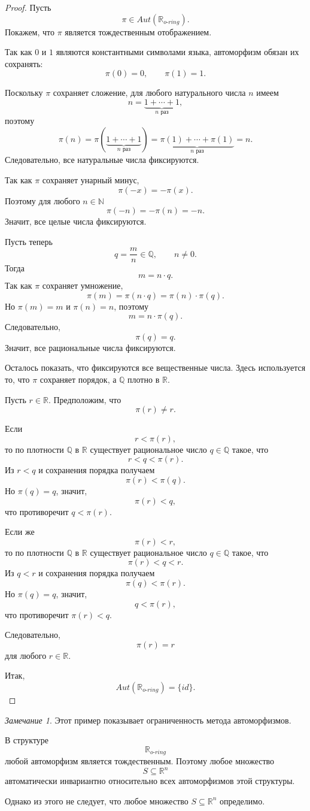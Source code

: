 \documentclass[12pt,a4paper,oneside,openany]{book}
\theoremstyle{definition}
\theoremstyle{plain}
\theoremstyle{remark}
\newtheorem{remark}{Замечание}[chapter]
\begin{document}
\begin{proof}
Пусть
\[
\pi\in Aut(\mathbb R_{o\text{-}ring}).
\]
Покажем, что $\pi$ является тождественным отображением.

Так как $0$ и $1$ являются константными символами языка, автоморфизм обязан их сохранять:
\[
\pi(0)=0,
\qquad
\pi(1)=1.
\]

Поскольку $\pi$ сохраняет сложение, для любого натурального числа $n$ имеем
\[
n=\underbrace{1+\cdots+1}_{n\text{ раз}},
\]
поэтому
\[
\pi(n)
=
\pi(\underbrace{1+\cdots+1}_{n\text{ раз}})
=
\underbrace{\pi(1)+\cdots+\pi(1)}_{n\text{ раз}}
=
n.
\]
Следовательно, все натуральные числа фиксируются.

Так как $\pi$ сохраняет унарный минус,
\[
\pi(-x)=-\pi(x).
\]
Поэтому для любого $n\in\mathbb N$
\[
\pi(-n)=-\pi(n)=-n.
\]
Значит, все целые числа фиксируются.

Пусть теперь
\[
q=\frac mn\in\mathbb Q,
\qquad n\ne0.
\]
Тогда
\[
m=n\cdot q.
\]
Так как $\pi$ сохраняет умножение,
\[
\pi(m)=\pi(n\cdot q)=\pi(n)\cdot\pi(q).
\]
Но $\pi(m)=m$ и $\pi(n)=n$, поэтому
\[
m=n\cdot\pi(q).
\]
Следовательно,
\[
\pi(q)=q.
\]
Значит, все рациональные числа фиксируются.

Осталось показать, что фиксируются все вещественные числа. Здесь используется то, что $\pi$ сохраняет порядок, а $\mathbb Q$ плотно в $\mathbb R$.

Пусть $r\in\mathbb R$. Предположим, что
\[
\pi(r)\ne r.
\]

Если
\[
r<\pi(r),
\]
то по плотности $\mathbb Q$ в $\mathbb R$ существует рациональное число $q\in\mathbb Q$ такое, что
\[
r<q<\pi(r).
\]
Из $r<q$ и сохранения порядка получаем
\[
\pi(r)<\pi(q).
\]
Но $\pi(q)=q$, значит,
\[
\pi(r)<q,
\]
что противоречит $q<\pi(r)$.

Если же
\[
\pi(r)<r,
\]
то по плотности $\mathbb Q$ в $\mathbb R$ существует рациональное число $q\in\mathbb Q$ такое, что
\[
\pi(r)<q<r.
\]
Из $q<r$ и сохранения порядка получаем
\[
\pi(q)<\pi(r).
\]
Но $\pi(q)=q$, значит,
\[
q<\pi(r),
\]
что противоречит $\pi(r)<q$.

Следовательно,
\[
\pi(r)=r
\]
для любого $r\in\mathbb R$.

Итак,
\[
Aut(\mathbb R_{o\text{-}ring})=\{id\}.
\]
\end{proof}

\begin{remark}
Этот пример показывает ограниченность метода автоморфизмов.

В структуре
\[
\mathbb R_{o\text{-}ring}
\]
любой автоморфизм является тождественным. Поэтому любое множество
\[
S\subseteq\mathbb R^n
\]
автоматически инвариантно относительно всех автоморфизмов этой структуры.

Однако из этого не следует, что любое множество $S\subseteq\mathbb R^n$ определимо.
\end{remark}
\end{document}

